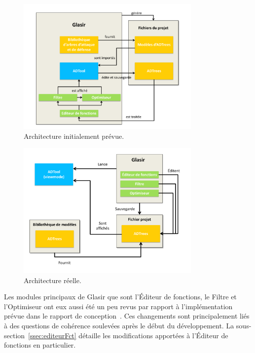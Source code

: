 		\begin{figure}[H]
            \centering
                \includegraphics[width=0.8\textwidth]{figure/archiGlasir.pdf}
            \caption{Architecture initialement prévue.}
            \label{fig:archiPrevue}
        \end{figure}
	
        
        \begin{figure}[H]
            \centering
                \includegraphics[width=0.8\textwidth]{figure/archiReelle.pdf}
            \caption{Architecture réelle.}
            \label{fig:archiReelle}
        \end{figure}
        
Les modules principaux de Glasir que sont l'Éditeur de fonctions, le Filtre et l'Optimiseur ont eux aussi été un peu revus par rapport à l'implémentation prévue dans le rapport de conception~\cite{conception}. Ces changements sont principalement liés à des questions de cohérence soulevées après le début du développement. La {\sc sous-section}~\ref{ssec:editeurFct} détaille les modifications apportées à l'Éditeur de fonctions en particulier.

